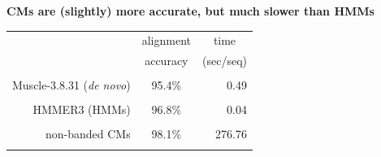 \documentclass[landscape]{slides}
\begin{document}
\begin{slide}
\begin{center}

\textbf{CMs are (slightly) more accurate, but much slower than HMMs}
\end{center}
\medskip
\medskip
\begin{center}

\begin{tabular}{rcr} 
& \multicolumn{1}{c}{alignment} & \multicolumn{1}{c}{time} \\
& \multicolumn{1}{c}{accuracy} & \multicolumn{1}{c}{(sec/seq)} \\ \hline
& \multicolumn{1}{c}{} & \multicolumn{1}{c}{} \\
Muscle-3.8.31 (\emph{de novo}) & 95.4\% & 0.49 \\
& \multicolumn{1}{c}{} & \multicolumn{1}{c}{} \\
HMMER3 (HMMs) & 96.8\% & 0.04 \\ 
& \multicolumn{1}{c}{} & \multicolumn{1}{c}{} \\
non-banded CMs & 98.1\% & 276.76 \\
& \multicolumn{1}{c}{} & \multicolumn{1}{c}{} \\
\end{tabular}
\end{center}

\vfill
\end{slide}
\end{document}
